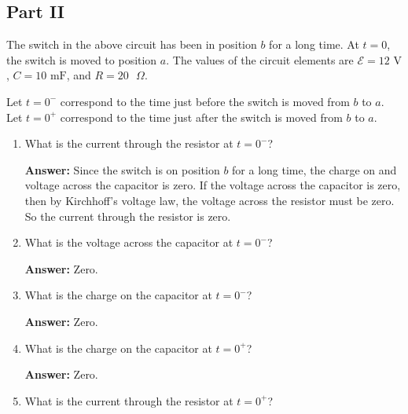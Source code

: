 \documentclass{article}
\begin{document}
\newpage

\subsection{Part II}



The switch in the above circuit has been in position $b$ for a long time. At $t = 0$, the switch is moved to position $a$. The values of the circuit elements are $\mathcal{E}= 12\text{ V}$, $C = 10\text{ mF}$, and $R = 20\text{ }\Omega$.

Let $t=0^-$ correspond to the time just before the switch is moved from $b$ to $a$. Let $t=0^+$ correspond to the time just after the switch is moved from $b$ to $a$.

\begin{enumerate}

  \item What is the current through the resistor at $t=0^-$?

        \ifsolutions
        {\bf Answer: } Since the switch is on position $b$ for a long time, the charge on and voltage across the capacitor is zero. If the voltage across the capacitor is zero, then by Kirchhoff's voltage law, the voltage across the resistor must be zero. So the current through the resistor is zero.
        \else
        \vskip 56.25pt
        \fi
        \ifsolutions\else
        \vskip 56.25pt
        \fi

  \item What is the voltage across the capacitor at $t=0^-$?

        \ifsolutions
        {\bf Answer: } Zero.
        \else
        \vskip 56.25pt
        \fi
        \ifsolutions\else
        \vskip 56.25pt
        \fi

  \item What is the charge on the capacitor at $t=0^-$?

        \ifsolutions
        {\bf Answer: } Zero.
        \else
        \vskip 56.25pt
        \fi
        \ifsolutions\else
        \vskip 56.25pt
        \fi

  \item What is the charge on the capacitor at  $t=0^+$?

        \ifsolutions
        {\bf Answer: } Zero.
        \else
        \vskip 56.25pt
        \fi
        \ifsolutions\else
        \vskip 56.25pt
        \fi

  \item What is the current through the resistor at $t=0^+$?


\end{enumerate}
\end{document}
